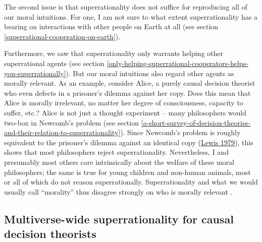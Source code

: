 The second issue is that superrationality does not suffice for
reproducing all of our moral intuitions. For one, I am not sure to what
extent superrationality has a bearing on interactions with other people
on Earth at all (see section \ref{superrational-cooperation-on-earth}).

Furthermore, we saw that superrationality only warrants helping other
superrational agents (see section
\ref{only-helping-superrational-cooperators-helps-you-superrationally}). But
our moral intuitions also regard other agents as morally relevant. As an
example, consider Alice, a purely causal decision theorist who even
defects in a prisoner's dilemma against her copy. Does this mean that
Alice is morally irrelevant, no matter her degree of consciousness,
capacity to suffer, etc.? Alice is not just a thought experiment -- many
philosophers would two-box in Newcomb's problem (see section
\ref{a-short-survey-of-decision-theories-and-their-relation-to-superrationality}). Since Newcomb's problem is roughly equivalent to
the prisoner's dilemma against an identical copy
(\href{https://sl4librarian.files.wordpress.com/2017/01/lewis-prisoners-dilemma-newcomb-problem.pdf}{Lewis
1979}), this shows that most philosophers reject superrationality.
Nevertheless, I and presumably most others care intrinsically about the
welfare of these moral philosophers; the same is true for young children
and non-human animals, most or all of which do not reason
superrationally. Superrationality and what we would usually call
``morality'' thus disagree strongly on who is morally relevant
\parencite[][sections 7.2.2 and 7.2.3]{Drescher2006-ky}.

\hypertarget{multiverse-wide-superrationality-for-causal-decision-theorists}{\subsection{Multiverse-wide
superrationality for causal decision
theorists}\label{multiverse-wide-superrationality-for-causal-decision-theorists}}

